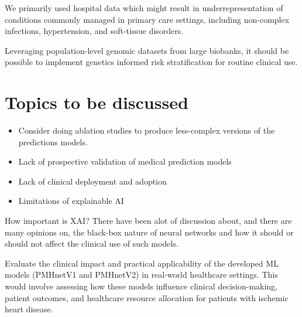 We primarily used hospital data which might result in underrepresentation of
conditions commonly managed in primary care settings,
including non-complex infections, hypertension, and soft-tissue disorders.
~\autocite{finleyWhat2018}

Leveraging population-level genomic datasets from large biobanks,
it should be possible to implement genetics informed risk stratification
for routine clinical use.


\section{Topics to be discussed}
\begin{itemize}
    \item Consider doing ablation studies to produce less-complex versions
        of the predictions models.
    \item Lack of prospective validation of medical prediction models
    \item Lack of clinical deployment and adoption 
    \item Limitations of explainable AI
\end{itemize}


How important is XAI? 
There have been alot of discussion about, and there are many opinions on, 
the black-box nature of neural networks and 
how it should or should not affect the clinical use of such models.
\autocite{gunningXAI2019, vanderveldenExplainable2022}




Evaluate the clinical impact and practical applicability of the developed ML models (PMHnetV1 and PMHnetV2) in real-world healthcare settings. This would involve assessing how these models influence clinical decision-making, patient outcomes, and healthcare resource allocation for patients with ischemic heart disease.
